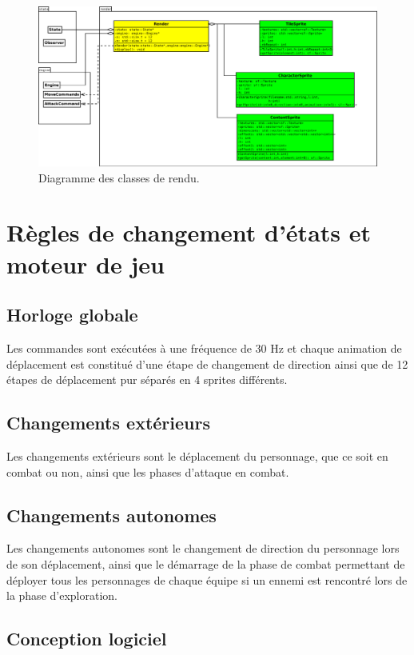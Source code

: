 \documentclass[a4paper,12pt]{article}
\begin{document}
\begin{landscape}
    \begin{figure}[p]
        \includegraphics[width=0.9\paperheight]{render.png}
        \caption{\label{uml:engine}Diagramme des classes de rendu.}
    \end{figure}
\end{landscape}

\section{Règles de changement d'états et moteur de jeu}

\subsection{Horloge globale}
	Les commandes sont exécutées à une fréquence de 30 Hz et chaque animation de déplacement est constitué d'une étape de changement de direction ainsi que de 12 étapes de déplacement pur séparés en 4 sprites différents.


\subsection{Changements extérieurs}
	Les changements extérieurs sont le déplacement du personnage, que ce soit en combat ou non, ainsi que les phases d'attaque en combat.


\subsection{Changements autonomes}
	Les changements autonomes sont le changement de direction du personnage lors de son déplacement, ainsi que le démarrage de la phase de combat permettant de déployer tous les personnages de chaque équipe si un ennemi est rencontré lors de la phase d'exploration.

\subsection{Conception logiciel}
\end{document}
